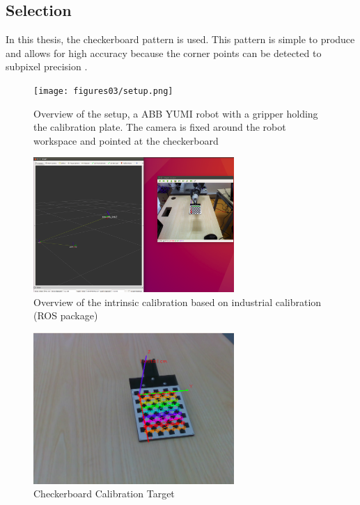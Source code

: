 \subsection{Selection}
In this thesis, the checkerboard pattern is used.  This pattern is simple to produce and allows for high accuracy because the corner points can be detected to subpixel precision \cite{planarTargets}.







\begin{figure}[!h]
\begin{center}
\texttt{[image: figures03/setup.png]}
\caption{Overview of the setup, a ABB YUMI robot with a gripper holding the calibration plate. The camera is fixed around the robot workspace and pointed at the checkerboard}%
\label{fig:setup}
\end{center}
\end{figure}



\iffalse




\begin{figure}[!h]
\begin{center}
\includegraphics[width=3in]{figures03/rviz1.png}
\caption{Overview of the intrinsic calibration based on industrial calibration (ROS package)}%
\label{fig:rosCAL}
\end{center}
\end{figure}



\begin{figure}[!h]
\begin{center}
\includegraphics[width=3in]{figures03/calibrationtarget1.png}
\caption{Checkerboard Calibration Target}%
\label{fig:pipeline}
\end{center}
\end{figure}

